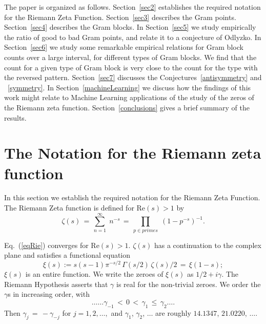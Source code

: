 \documentclass[twoside]{article}
\theoremstyle{definition}
\begin{document}
The paper is organized as follows.
Section~\ref{sec2} establishes the required notation for the 
Riemann Zeta Function. 
Section~\ref{sec3} describes the Gram points. 
Section~\ref{sec4} describes the Gram blocks. 
In Section~\ref{sec5} we study empirically the ratio of good to bad Gram points, and relate it to a conjecture of Odlyzko. 
In Section~\ref{sec6} we study some remarkable empirical relations for Gram block counts over a large interval, for different types of Gram blocks. We find that the count for
a given type of Gram block is very close to the count for the type with the reversed pattern. 
Section~\ref{sec7} discusses  {the Conjectures~\ref{antisymmetry} and ~\ref{symmetry}}. 
 {In Section~\ref{machineLearning} we discuss how the findings of this work might relate to Machine Learning applications of the study of the zeros of the Riemann zeta function.}
Section~\ref{conclusions} gives a brief summary of the results. 

\section{\label{sec2}The Notation for the Riemann zeta function }

In this section we  establish the required notation for the 
Riemann Zeta Function. 
The Riemann Zeta function is defined for $\mathrm{Re} (s) > 1$ by
\begin{equation}
\zeta ( s ) \, = \, \sum^{\infty}_{n = 1} \; n^{-s} \, = \, \prod_{p \in primes} \;
\left( 1 - p^{-s} \right)^{-1}.
\label{eqRie}
\end{equation}

Eq.~(\ref{eqRie})  converges for $\mathrm{Re} (s) > 1$.  
 $\zeta ( s )$ has a  continuation
to the complex plane and satisfies a functional equation \cite{Riemann(1858),Riemann 1892, Titchmarsh 1986,Edwards(1974)}
\begin{equation}  
\xi(s):=s(s-1) \pi^{-s/2} \, \Gamma (s/2) \, \zeta ( s )/2 \, = \, \xi ( 1 - s );
\label{eq:xifunc}
\end{equation}
$\xi(s)$ is an entire function. We
write the zeroes of $\xi(s)$ as $1/2 + i \gamma$. The Riemann Hypothesis  
asserts that $\gamma$ is real for the non-trivial zeroes.
We order the $\gamma$s in increasing order, with 
\begin{equation}
\ldots \ldots \gamma_{-1} \, < \, 0 \, < \, 
\gamma_1 \, \leq \, \gamma_2 \ldots. 
\end{equation}
Then $\gamma_j \, = \, - \gamma_{-j}$ for $j = 1, 2, \ldots,$ 
and    $\gamma_1$, $\gamma_2$, $\ldots$  are roughly
$14.1347$, $21.0220$, $\ldots$.
\end{document}
